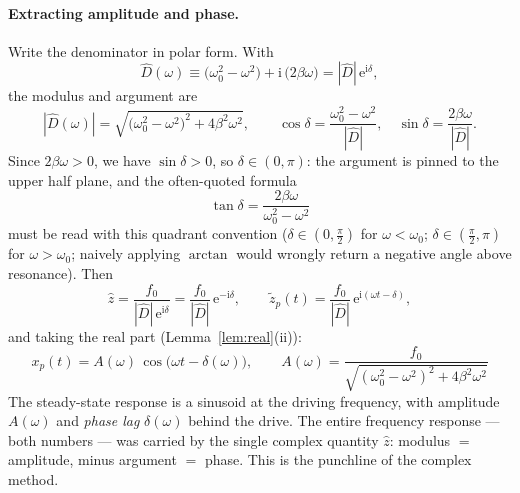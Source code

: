 \documentclass[11pt]{article}
\theoremstyle{plain}
\theoremstyle{definition}
\theoremstyle{remark}
\newcommand{\ee}{\mathrm{e}}
\newcommand{\ii}{\mathrm{i}}
\begin{document}
\paragraph{Extracting amplitude and phase.}
Write the denominator in polar form. With
\begin{equation}
  \hat D(\omega) \equiv \bigl(\omega_0^2 - \omega^2\bigr) + \ii\,\bigl(2\beta\omega\bigr)
  = |\hat D|\,\ee^{\ii\delta},
\end{equation}
the modulus and argument are
\begin{equation}
  |\hat D(\omega)| = \sqrt{\bigl(\omega_0^2-\omega^2\bigr)^2 + 4\beta^2\omega^2},
  \qquad
  \cos\delta = \frac{\omega_0^2-\omega^2}{|\hat D|},
  \quad
  \sin\delta = \frac{2\beta\omega}{|\hat D|} .
  \label{eq:D-polar}
\end{equation}
Since $2\beta\omega > 0$, we have $\sin\delta>0$, so
$\delta \in (0,\pi)$: the argument is pinned to the upper half plane, and the
often-quoted formula
\begin{equation}
  \tan\delta = \frac{2\beta\omega}{\omega_0^2-\omega^2}
\end{equation}
must be read with this quadrant convention ($\delta\in(0,\tfrac\pi2)$ for
$\omega<\omega_0$; $\delta\in(\tfrac\pi2,\pi)$ for $\omega>\omega_0$; naively
applying $\arctan$ would wrongly return a negative angle above resonance).
Then
\begin{equation}
  \hat z = \frac{f_0}{|\hat D|\,\ee^{\ii\delta}} = \frac{f_0}{|\hat D|}\,\ee^{-\ii\delta},
  \qquad
  \tilde z_p(t) = \frac{f_0}{|\hat D|}\,\ee^{\ii(\omega t - \delta)},
\end{equation}
and taking the real part (Lemma~\ref{lem:real}(ii)):
\begin{equation}
  \boxed{\;
  x_p(t) = A(\omega)\,\cos\bigl(\omega t - \delta(\omega)\bigr),
  \qquad
  A(\omega) = \frac{f_0}{\sqrt{(\omega_0^2-\omega^2)^2 + 4\beta^2\omega^2}}
  \;}
  \label{eq:steady-state}
\end{equation}
The steady-state response is a sinusoid at the driving frequency, with
amplitude $A(\omega)$ and \emph{phase lag} $\delta(\omega)$ behind the drive.
The entire frequency response --- both numbers --- was carried by the single
complex quantity $\hat z$: modulus $=$ amplitude, minus argument $=$ phase.
This is the punchline of the complex method.
\end{document}
